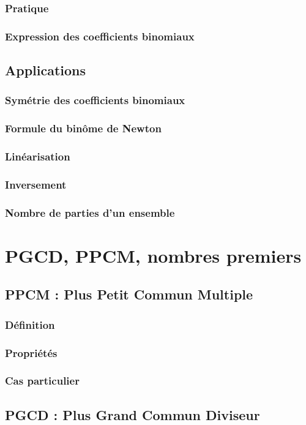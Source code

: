 \documentclass[12pt,a4paper,french]{book}
\begin{document}
		\subsection{Pratique}
		\subsection{Expression des coefficients binomiaux}
	\section{Applications}
		\subsection{Symétrie des coefficients binomiaux}
		\subsection{Formule du binôme de Newton}
		\subsection{Linéarisation}
		\subsection{Inversement}
		\subsection{Nombre de parties d'un ensemble}
		
\chapter{PGCD, PPCM, nombres premiers}
	\section{PPCM : Plus Petit Commun Multiple}
		\subsection{Définition}
		\subsection{Propriétés}
		\subsection{Cas particulier}
	\section{PGCD : Plus Grand Commun Diviseur}
\end{document}

